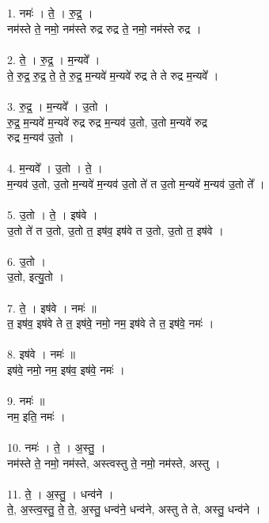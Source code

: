 \subsection{}
\subsubsection{}
1. नमः॑ । ते॒ । रु॒द्र॒ ।\\
नम॑स्ते ते॒ नमो॒ नम॑स्ते रुद्र रुद्र ते॒ नमो॒ नम॑स्ते रुद्र ।\\
\\
2. ते॒ । रु॒द्र॒ । म॒न्यवे᳚ ।\\
ते॒ रु॒द्र॒ रु॒द्र॒ ते॒ ते॒ रु॒द्र॒ म॒न्यवे॑ म॒न्यवे॑ रुद्र ते ते रुद्र म॒न्यवे᳚ ।\\
\\
3. रु॒द्र॒ । म॒न्यवे᳚ । उ॒तो ।\\
रु॒द्र॒ म॒न्यवे॑ म॒न्यवे॑ रुद्र रुद्र म॒न्यव॑ उ॒तो, उ॒तो म॒न्यवे॑ रुद्र\\
रुद्र म॒न्यव॑ उ॒तो ।\\
\\
4. म॒न्यवे᳚ । उ॒तो । ते॒ ।\\
म॒न्यव॑ उ॒तो, उ॒तो म॒न्यवे॑ म॒न्यव॑ उ॒तो ते॑ त उ॒तो म॒न्यवे॑ म॒न्यव॑ उ॒तो ते᳚ ।\\
\\
5. उ॒तो । ते॒ । इष॑वे ।\\
उ॒तो ते॑ त उ॒तो, उ॒तो त॒ इष॑व॒ इष॑वे त उ॒तो, उ॒तो त॒ इष॑वे ।\\
\\
6. उ॒तो ।\\
उ॒तो, इत्यु॒तो ।\\
\\
7. ते॒ । इष॑वे । नमः॑ ॥\\
त॒ इष॑व॒ इष॑वे ते त॒ इष॑वे॒ नमो॒ नम॒ इष॑वे ते त॒ इष॑वे॒ नमः॑ ।\\
\\
8. इष॑वे । नमः॑ ॥\\
इष॑वे॒ नमो॒ नम॒ इष॑व॒ इष॑वे॒ नमः॑ ।\\
\\
9. नमः॑ ॥\\
नम॒ इति॒ नमः॑ ।\\
\\
10. नमः॑ । ते॒ । अ॒स्तु॒ ।\\
नम॑स्ते ते॒ नमो॒ नम॑स्ते, अस्त्वस्तु ते॒ नमो॒ नम॑स्ते, अस्तु ।\\
\\
11. ते॒ । अ॒स्तु॒ । धन्व॑ने ।\\
ते॒, अ॒स्त्व॒स्तु॒ ते॒ ते॒, अ॒स्तु॒ धन्व॑ने॒ धन्व॑ने, अस्तु ते ते, अस्तु॒ धन्व॑ने ।\\
